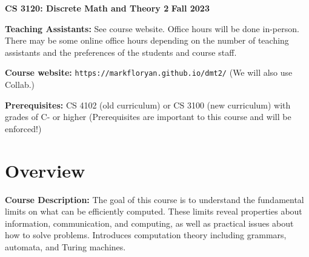 \documentclass[12pt]{article}
\begin{document}
\textbf{\Large CS 3120: Discrete Math and Theory 2} \hfill \textbf{\Large Fall 2023}

\vskip 0.5in 


\vskip 0.1in
\textbf{Teaching Assistants:} See course website.  Office hours will be done in-person. There may be some online office hours depending on the number of teaching assistants and the preferences of the students and course staff.

\vskip 0.1in
\textbf{Course website:} {\tt https://markfloryan.github.io/dmt2/} (We will also use Collab.)

\textbf{Prerequisites:} CS 4102 (old curriculum) or CS 3100 (new curriculum) with grades of C- or higher (Prerequisites are important to this course and will be enforced!)

\section*{Overview}

\textbf{Course Description:} The goal of this course is to understand the fundamental limits on what can be efficiently computed. These limits reveal properties about information, communication, and computing, as well as practical issues about how to solve problems. Introduces computation theory including grammars, automata, and Turing machines.
\end{document}
